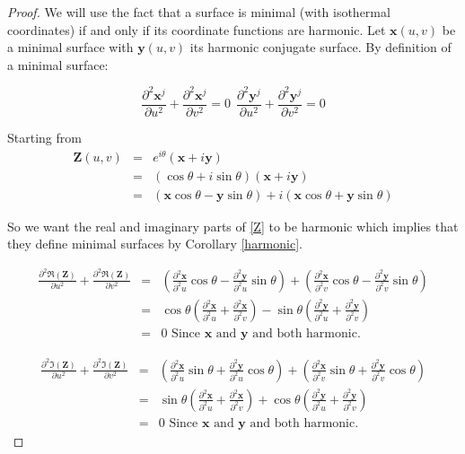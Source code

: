 \begin{proof}
We will use the fact that a surface is minimal (with isothermal coordinates) if and only if its coordinate functions are harmonic.
Let $\mathbf x(u,v)$ be a minimal surface with $\mathbf y(u,v)$ its harmonic conjugate surface. By definition of a minimal surface:

\begin{displaymath}
\frac{\partial^2 \mathbf x^j}{\partial u^2}+\frac{\partial^2 \mathbf x^j}{\partial v^2}=0 \ \
\frac{\partial^2 \mathbf y^j}{\partial u^2}+\frac{\partial^2 \mathbf y^j}{\partial v^2}=0
\end{displaymath}

Starting from
\begin{eqnarray}
\nonumber
\mathbf Z(u,v) &=& e^{i\theta}(\mathbf x + i \mathbf y)
\\
\nonumber
&=& (\cos \theta + i \sin \theta)(\mathbf x + i \mathbf y)
\\
&=& (\mathbf x \cos \theta - \mathbf y \sin \theta) + i(\mathbf x \cos \theta + \mathbf y \sin \theta)
\label{Z} 
\end{eqnarray} 

So we want the real and imaginary parts of \ref{Z} to be harmonic which implies that they define minimal surfaces by Corollary \ref{harmonic}.

\begin{eqnarray}
\nonumber
\frac{\partial^2 \Re(\mathbf Z)}{\partial u^2} + \frac{\partial^2 \Re(\mathbf Z)}{\partial v^2} &=& \left ( \frac{\partial^2 \mathbf x}{\partial^2 u} \cos \theta - \frac{\partial^2 \mathbf y}{\partial^2 u} \sin \theta \right ) + \left ( \frac{\partial^2 \mathbf x}{\partial^2 v} \cos \theta - \frac{\partial^2 \mathbf y}{\partial^2 v} \sin \theta \right )
\\
\nonumber
&=& \cos\theta \left (\frac{\partial^2 \mathbf x}{\partial^2 u} + \frac{\partial^2 \mathbf x}{\partial^2 v} \right ) - \sin\theta \left (\frac{\partial^2 \mathbf y}{\partial^2 u} + \frac{\partial^2 \mathbf y}{\partial^2 v} \right )
\\
\nonumber
&=& 0 \mbox{\ \ \ Since $\mathbf x$ and $\mathbf y$ and both harmonic.}
\end{eqnarray}

\begin{eqnarray}
\nonumber
\frac{\partial^2 \Im(\mathbf Z)}{\partial u^2} + \frac{\partial^2 \Im(\mathbf Z)}{\partial v^2} &=& \left ( \frac{\partial^2 \mathbf x}{\partial^2 u} \sin \theta + \frac{\partial^2 \mathbf y}{\partial^2 u} \cos \theta \right ) + \left ( \frac{\partial^2 \mathbf x}{\partial^2 v} \sin \theta + \frac{\partial^2 \mathbf y}{\partial^2 v} \cos \theta \right )
\\
\nonumber
&=& \sin\theta \left (\frac{\partial^2 \mathbf x}{\partial^2 u} + \frac{\partial^2 \mathbf x}{\partial^2 v} \right ) + \cos\theta \left (\frac{\partial^2 \mathbf y}{\partial^2 u} + \frac{\partial^2 \mathbf y}{\partial^2 v} \right )
\\
\nonumber
&=& 0 \mbox{\ \ \ Since $\mathbf x$ and $\mathbf y$ and both harmonic.}
\end{eqnarray}
\end{proof}

